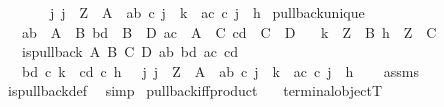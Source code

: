 \begin{isabellebody}
\ \ \ \ \ \ {\isacharparenleft}{\kern0pt}{\isasymexists}{\isacharbang}{\kern0pt}\ j{\isachardot}{\kern0pt}\ j\ {\isacharcolon}{\kern0pt}\ Z\ {\isasymrightarrow}\ A\ {\isasymand}\ ab\ {\isasymcirc}\isactrlsub c\ j\ {\isacharequal}{\kern0pt}\ k\ {\isasymand}\ ac\ {\isasymcirc}\isactrlsub c\ j\ {\isacharequal}{\kern0pt}\ h{\isacharparenright}{\kern0pt}{\isacharparenright}{\kern0pt}{\isacharparenright}{\kern0pt}{\isachardoublequoteclose}\isanewline
\isanewline
{}\isamarkupfalse%
\ pullback{\isacharunderscore}{\kern0pt}unique{\isacharcolon}{\kern0pt}\isanewline
\ \ \ {\isachardoublequoteopen}ab\ {\isacharcolon}{\kern0pt}\ A\ {\isasymrightarrow}\ B{\isachardoublequoteclose}\ {\isachardoublequoteopen}bd\ {\isacharcolon}{\kern0pt}\ B\ {\isasymrightarrow}\ D{\isachardoublequoteclose}\ {\isachardoublequoteopen}ac\ {\isacharcolon}{\kern0pt}\ A\ {\isasymrightarrow}\ C{\isachardoublequoteclose}\ {\isachardoublequoteopen}cd\ {\isacharcolon}{\kern0pt}\ C\ {\isasymrightarrow}\ D{\isachardoublequoteclose}\isanewline
\ \ \ {\isachardoublequoteopen}k\ {\isacharcolon}{\kern0pt}\ Z\ {\isasymrightarrow}\ B{\isachardoublequoteclose}\ {\isachardoublequoteopen}h\ {\isacharcolon}{\kern0pt}\ Z\ {\isasymrightarrow}\ C{\isachardoublequoteclose}\isanewline
\ \ \ {\isachardoublequoteopen}is{\isacharunderscore}{\kern0pt}pullback\ A\ B\ C\ D\ ab\ bd\ ac\ cd{\isachardoublequoteclose}\isanewline
\ \ \ {\isachardoublequoteopen}bd\ {\isasymcirc}\isactrlsub c\ k\ {\isacharequal}{\kern0pt}\ cd\ {\isasymcirc}\isactrlsub c\ h\ {\isasymLongrightarrow}\ {\isacharparenleft}{\kern0pt}{\isasymexists}{\isacharbang}{\kern0pt}\ j{\isachardot}{\kern0pt}\ j\ {\isacharcolon}{\kern0pt}\ Z\ {\isasymrightarrow}\ A\ {\isasymand}\ ab\ {\isasymcirc}\isactrlsub c\ j\ {\isacharequal}{\kern0pt}\ k\ {\isasymand}\ ac\ {\isasymcirc}\isactrlsub c\ j\ {\isacharequal}{\kern0pt}\ h{\isacharparenright}{\kern0pt}{\isachardoublequoteclose}\isanewline
%
\isadelimproof
\ \ %
\endisadelimproof
%
\isatagproof
{}\isamarkupfalse%
\ assms\ \isamarkupfalse%
\ is{\isacharunderscore}{\kern0pt}pullback{\isacharunderscore}{\kern0pt}def\ \isamarkupfalse%
\ simp%
\endisatagproof
{\isafoldproof}%
%
\isadelimproof
\isanewline
%
\endisadelimproof
\isanewline
{}\isamarkupfalse%
\ pullback{\isacharunderscore}{\kern0pt}iff{\isacharunderscore}{\kern0pt}product{\isacharcolon}{\kern0pt}\isanewline
\ \ \ {\isachardoublequoteopen}terminal{\isacharunderscore}{\kern0pt}object{\isacharparenleft}{\kern0pt}T{\isacharparenright}{\kern0pt}{\isachardoublequoteclose}\isanewline

\end{isabellebody}
